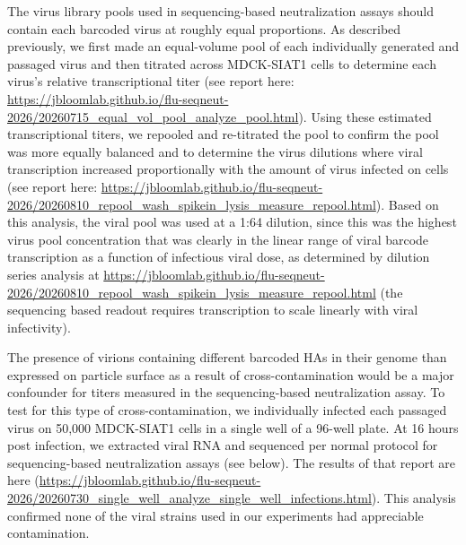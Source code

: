 The virus library pools used in sequencing-based neutralization assays should contain each barcoded virus at roughly equal proportions. As described previously, we first made an equal-volume pool of each individually generated and passaged virus and then titrated across MDCK-SIAT1 cells to determine each virus's relative transcriptional titer (see report here: \href{https://jbloomlab.github.io/flu-seqneut-2026/20260715_equal_vol_pool_analyze_pool.html}{https://jbloomlab.github.io/flu-seqneut-2026/20260715\_equal\_vol\_pool\_analyze\_pool.html}). Using these estimated transcriptional titers, we repooled and re-titrated the pool to confirm the pool was more equally balanced and to determine the virus dilutions where viral transcription increased proportionally with the amount of virus infected on cells (see report here: \href{https://jbloomlab.github.io/flu-seqneut-2026/20260810_repool_wash_spikein_lysis_measure_repool.html}{https://jbloomlab.github.io/flu-seqneut-2026/20260810\_repool\_wash\_spikein\_lysis\_measure\_repool.html}). Based on this analysis, the viral pool was used at a 1:64 dilution, since this was the highest virus pool concentration that was clearly in the linear range of viral barcode transcription as a function of infectious viral dose, as determined by dilution series analysis at \href{https://jbloomlab.github.io/flu-seqneut-2026/20260810_repool_wash_spikein_lysis_measure_repool.html}{https://jbloomlab.github.io/flu-seqneut-2026/20260810\_repool\_wash\_spikein\_lysis\_measure\_repool.html} (the sequencing based readout requires transcription to scale linearly with viral infectivity).

The presence of virions containing different barcoded HAs in their genome than expressed on particle surface as a result of cross-contamination would be a major confounder for titers measured in the sequencing-based neutralization assay. To test for this type of cross-contamination, we individually infected each passaged virus on 50,000 MDCK-SIAT1 cells in a single well of a 96-well plate. At 16 hours post infection, we extracted viral RNA and sequenced per normal protocol for sequencing-based neutralization assays (see below). The results of that report are here (\href{https://jbloomlab.github.io/flu-seqneut-2026/20260730_single_well_analyze_single_well_infections.html}{https://jbloomlab.github.io/flu-seqneut-2026/20260730\_single\_well\_analyze\_single\_well\_infections.html}). This analysis confirmed none of the viral strains used in our experiments had appreciable contamination.

